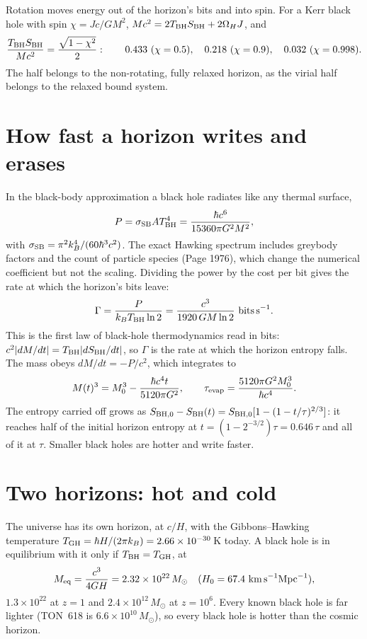 Rotation moves energy out of the horizon's bits and into spin. For a Kerr black hole with spin $\chi=Jc/GM^2$, $Mc^2=2T_{\rm BH}S_{\rm BH}+2\Omega_HJ$, and
\begin{equation}
\frac{T_{\rm BH}S_{\rm BH}}{Mc^2}=\frac{\sqrt{1-\chi^2}}{2}:\qquad 0.433\ (\chi=0.5),\quad 0.218\ (\chi=0.9),\quad 0.032\ (\chi=0.998).
\end{equation}
The half belongs to the non-rotating, fully relaxed horizon, as the virial half belongs to the relaxed bound system.

\section{How fast a horizon writes and erases}
In the black-body approximation a black hole radiates like any thermal surface,
\begin{equation}
P=\sigma_{\rm SB}AT_{\rm BH}^4=\frac{\hbar c^6}{15360\pi G^2M^2},
\end{equation}
with $\sigma_{\rm SB}=\pi^2k_B^4/(60\hbar^3c^2)$. The exact Hawking spectrum includes greybody factors and the count of particle species (Page 1976), which
change the numerical coefficient but not the scaling. Dividing the power by the cost per bit gives the rate at which the horizon's bits leave:
\begin{equation}
\Gamma=\frac{P}{k_BT_{\rm BH}\ln2}=\frac{c^3}{1920\,GM\ln2}\ \text{bits\,s}^{-1}.
\end{equation}
This is the first law of black-hole thermodynamics read in bits: $c^2|dM/dt|=T_{\rm BH}|dS_{\rm BH}/dt|$, so $\Gamma$ is the rate at which the horizon entropy
falls. The mass obeys $dM/dt=-P/c^2$, which integrates to
\begin{equation}
M(t)^3=M_0^3-\frac{\hbar c^4t}{5120\pi G^2},\qquad \tau_{\rm evap}=\frac{5120\pi G^2M_0^3}{\hbar c^4}.
\end{equation}
The entropy carried off grows as $S_{\rm BH,0}-S_{\rm BH}(t)=S_{\rm BH,0}[1-(1-t/\tau)^{2/3}]$: it reaches half of the initial horizon entropy at
$t=(1-2^{-3/2})\tau=0.646\,\tau$ and all of it at $\tau$. Smaller black holes are hotter and write faster.

\section{Two horizons: hot and cold}
The universe has its own horizon, at $c/H$, with the Gibbons--Hawking temperature $T_{\rm GH}=\hbar H/(2\pi k_B)=2.66\times10^{-30}$\,K today. A black hole is
in equilibrium with it only if $T_{\rm BH}=T_{\rm GH}$, at
\begin{equation}
M_{\rm eq}=\frac{c^3}{4GH}=2.32\times10^{22}\,M_\odot\quad(H_0=67.4\ \text{km\,s}^{-1}\text{Mpc}^{-1}),
\end{equation}
$1.3\times10^{22}$ at $z=1$ and $2.4\times10^{12}\,M_\odot$ at $z=10^6$. Every known black hole is far lighter (TON~618 is $6.6\times10^{10}\,M_\odot$), so every
black hole is hotter than the cosmic horizon.

